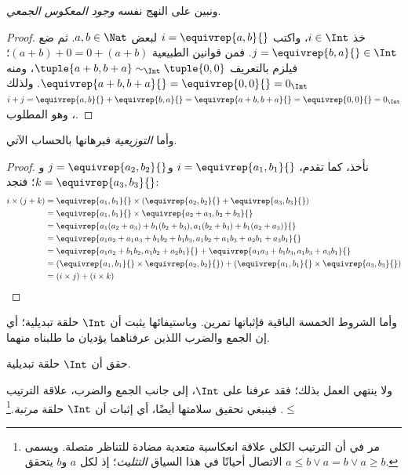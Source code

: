 \documentclass[../../../include/open-logic-section]{subfiles}
\begin{document}
ونبين على النهج نفسه \emph{وجود المعكوس الجمعي}.

\begin{proof}
خذ $i \in \Int$، واكتب $i = \equivrep{a,b}{}$ لبعض $a,b \in
\Nat$. ثم ضع $j = \equivrep{b,a}{} \in \Int$. فمن قوانين الطبيعية $(a+b) + 0 = 0 + (a+b)$؛ فيلزم بالتعريف $\tuple{a+b, b+a} \sim_\Int \tuple{0,0}$، ومنه $\equivrep{a+b, b+a}{} = \equivrep{0, 0}{} = 0_\Int$. ولذلك $i + j =
\equivrep{a,b}{}+\equivrep{b,a}{}=\equivrep{a+b, b+a}{}= \equivrep{0,
0}{} = 0_\Int$، وهو المطلوب.
\end{proof}

وأما \emph{التوزيعية} فبرهانها بالحساب الآتي.

\begin{proof}
نأخذ، كما تقدم، $i = \equivrep{a_1, b_1}{}$ و$j =
\equivrep{a_2,b_2}{}$ و$k = \equivrep{a_3, b_3}{}$؛ فنجد:
\begin{align*}
	i \times (j + k) 
	&= \equivrep{a_1, b_1}{} \times (\equivrep{a_2,b_2}{} + \equivrep{a_3, b_3}{})\\
	&= \equivrep{a_1, b_1}{} \times \equivrep{a_2 + a_3,b_2+b_3}{}\\
	&= \equivrep{a_1  (a_2 + a_3) + b_1  (b_2+b_3), a_1  (b_2 + b_3) + b_1 (a_2 + a_3)}{}\\
	&= \equivrep{a_1 a_2 + a_1a_3 + b_1 b_2+b_1b_3, a_1 b_2 + a_1b_3 + a_2b_1 + a_3b_1}{}\\		
	&= \equivrep{a_1a_2 + b_1b_2, a_1b_2 + a_2b_1}{} + \equivrep{a_1a_3 + b_1b_3, a_1b_3 + a_3b_1}{}\\
	&= (\equivrep{a_1, b_1}{} \times \equivrep{a_2,b_2}{}) + (\equivrep{a_1, b_1}{} \times  \equivrep{a_3, b_3}{})\\
	&= (i \times j) + (i \times k)
\end{align*}
\end{proof}

وأما الشروط الخمسة الباقية فإثباتها تمرين. وباستيفائها يثبت أن $\Int$ حلقة تبديلية؛ أي إن الجمع والضرب اللذين عرفناهما يؤديان ما طلبناه منهما.

\begin{prob}
حقق أن $\Int$ حلقة تبديلية.
\end{prob}

ولا ينتهي العمل بذلك؛ فقد عرفنا على $\Int$، إلى جانب الجمع والضرب، علاقة الترتيب $\leq$. فينبغي تحقيق سلامتها أيضًا، أي إثبات أن $\Int$ حلقة \emph{مرتبة}.\footnote{مر في  أن الترتيب الكلي علاقة انعكاسية متعدية مضادة للتناظر متصلة. ويسمى الاتصال أحيانًا في هذا السياق \emph{التثليث}؛ إذ لكل $a$ و$b$ يتحقق $a \leq b \lor a
= b \lor a \geq b$.}
\end{document}
